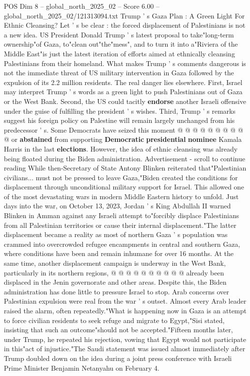 \begin{textsample}{POS Dim 8 – global\_north\_2025\_02 – Score 6.00 – global\_north\_2025\_02/121313094.txt}  \label{ex:f8_pos_316}
Trump ' s Gaza Plan : A Green Light For Ethnic Cleansing?
Let ' s be clear : the forced displacement of Palestinians is not a new idea.
US President Donald Trump ' s latest proposal to take"long-term ownership"of Gaza, to"clean out"the"mess", and to turn it into a"Riviera of the Middle East"is just the latest iteration of efforts aimed at ethnically cleansing Palestinians from their homeland.
What makes Trump ' s comments dangerous is not the immediate threat of US military intervention in Gaza followed by the expulsion of its 2.2 million residents.
The real danger lies elsewhere.
First, Israel may interpret Trump ' s words as a green light to push Palestinians out of Gaza or the West Bank.
Second, the US could tacitly \textbf{endorse} another Israeli offensive under the guise of fulfilling the president ' s wishes.
Third, Trump ' s remarks suggest his foreign policy on Palestine will remain largely unchanged from his predecessor ' s.
Some Democrats have seized this moment @ @ @ @ @ @ @ @ @ @ or \textbf{abstained} from supporting \textbf{Democratic} \textbf{presidential} \textbf{nominee} Kamala Harris in the last \textbf{elections}.
However, the idea of ethnic cleansing was already being floated during the Biden administration.
Advertisement - scroll to continue reading While then-Secretary of State Antony Blinken reiterated that"Palestinian civilians... must not be pressed to leave Gaza,"Biden created the conditions for displacement through unconditional military support for Israel.
This allowed one of the most devastating wars in modern Middle Eastern history to unfold.
Just days into the war, on October 13, 2023, Jordan ' s King Abdullah II warned Blinken in Amman against any Israeli attempt to"forcibly displace Palestinians from all Palestinian territories or cause their internal displacement."The latter displacement became a reality as most of northern Gaza ' s population was crammed into overcrowded refugee encampments in central and southern Gaza, where conditions have been and remain inhumane for over 16 months.
At the same time, another displacement campaign is underway in the West Bank, particularly in its northern regions, @ @ @ @ @ @ @ @ @ @ already been displaced in the Jenin governorate and other areas.
Despite this, the Biden administration has done little to pressure Israel to stop.
Arab concerns over Palestinian expulsion were real from the war ' s outset.
Almost every Arab leader raised the alarm, often repeatedly."What is happening now in Gaza is an attempt to force civilian residents to seek refuge and migrate to Egypt,"Sisi stated, insisting that such an outcome"should not be accepted."Fifteen months later, under Trump, he repeated his rejection, vowing that Egypt would not participate in this"act of injustice."The Saudi statement was issued almost immediately after Trump doubled down on the idea during a joint press conference with Israeli Prime Minister Benjamin Netanyahu on February 4.

\end{textsample}
